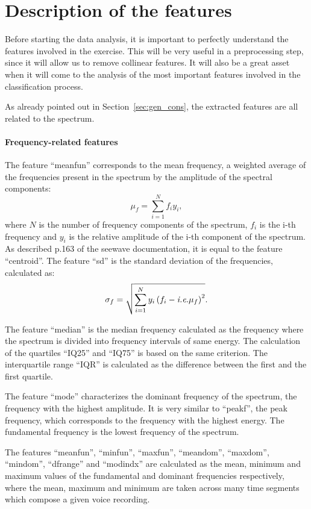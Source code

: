 \section{Description of the features}
\label{sec:feat_desc}
Before starting the data analysis, it is important to perfectly understand the features involved in the exercise. This will be very useful in a preprocessing step, since it will allow us to remove collinear features. It will also be a great asset when it will come to the analysis of the most important features involved in the classification process.

As already pointed out in Section~\ref{sec:gen_cons}, the extracted features are all related to the spectrum. 
\paragraph{Frequency-related features}
The feature ``meanfun'' corresponds to  the mean frequency, \ie{} a weighted average of the frequencies present in the spectrum by the amplitude of the spectral components:
\begin{equation}
\mu_f = \sum\limits_{i=1}^{N} f_i y_i ,
\end{equation} 
where $N$ is the number of frequency components of the spectrum, $f_i$ is the i-th frequency and $y_i$ is the relative amplitude of the i-th component of the spectrum. 
As described p.\num{163} of the seewave documentation, it is equal to the feature ``centroid''.
The feature ``sd'' is the standard deviation of the frequencies, calculated as:
\begin{equation}
\sigma_f = \sqrt{\sum\limits_{i=1}^{N}y_i \left(f_i-\textit{i.e.}\mu_f\right)^2}.
\end{equation}

The feature ``median'' is the median frequency calculated as the frequency where the spectrum is divided into frequency intervals of same energy. The calculation of the quartiles ``IQ25'' and  ``IQ75'' is based on the same criterion. The interquartile range ``IQR'' is calculated as the difference between the first and the first quartile.

The feature ``mode'' characterizes the dominant frequency of the spectrum, \ie{} the frequency with the highest amplitude. It is very similar to ``peakf'', the peak frequency, which corresponds to the frequency with the highest energy. The fundamental frequency is the lowest frequency of the spectrum.

The features ``meanfun'', ``minfun'', ``maxfun'', ``meandom'', ``maxdom'', ``mindom'', ``dfrange'' and ``modindx'' are calculated as the mean, minimum and maximum values of the fundamental and dominant frequencies respectively, where the mean, maximum and minimum are taken across many time segments which compose a given voice recording.

